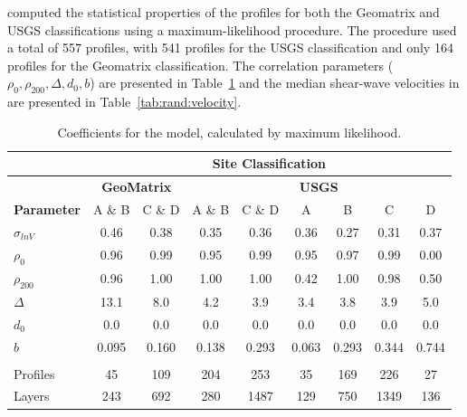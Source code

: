\documentclass[11pt]{report}
\begin{document}
\citet{toro:95} computed the statistical properties of the profiles for both the Geomatrix and USGS
classifications using a maximum-likelihood procedure.  The procedure used a total of 557 profiles,
with 541 profiles for the USGS classification and only 164 profiles for the Geomatrix
classification.  The correlation parameters ($\rho_0, \rho_{200}, \Delta, d_0, b$) are presented in
Table~\ref{tab:rand:coeffs} and the median shear-wave velocities in are presented in
Table~\ref{tab:rand:velocity}.

\begin{table}[tbp]
  \centering
  \begin{tabular}{lcc|cccccc}
	\hline\hline
	& \multicolumn{8}{c}{\textbf{Site Classification}} \\
	\hline
	& \multicolumn{2}{c|}{\textbf{GeoMatrix}} 
	& \multicolumn{6}{c}{\textbf{USGS}} \\
	\textbf{Parameter} & A \& B & C \& D & A \& B & C \& D &
	A & B & C & D  \\
	\hline
	$\sigma_{ln V}$	& 0.46 & 0.38 & 0.35 & 0.36 & 0.36 & 0.27 & 0.31 & 0.37 \\
	$\rho_0$ 		& 0.96 & 0.99 & 0.95 & 0.99 & 0.95 & 0.97 & 0.99 & 0.00 \\
	$\rho_{200}$ 	& 0.96 & 1.00 & 1.00 & 1.00 & 0.42 & 1.00 & 0.98 & 0.50 \\
	$\Delta$ 		& 13.1 & 8.0 & 4.2 & 3.9 & 3.4 & 3.8 & 3.9 & 5.0 \\
	$d_0$ 			&  0.0 & 0.0 & 0.0 & 0.0 & 0.0 & 0.0 & 0.0 & 0.0 \\
	$b$ 			& 0.095 & 0.160 & 0.138 & 0.293 & 0.063 & 0.293 & 0.344 & 0.744 \\
	\\
	Profiles 		& 45  & 109 & 204 & 253   & 35  & 169 & 226  & 27 \\
	Layers 			& 243 & 692 & 280 & 1487  & 129 & 750 & 1349 & 136 \\
	\hline\hline
  \end{tabular}
  \caption{Coefficients for the \citet{toro:95} model, calculated by maximum likelihood.}
  \label{tab:rand:coeffs}
\end{table}
\end{document}
